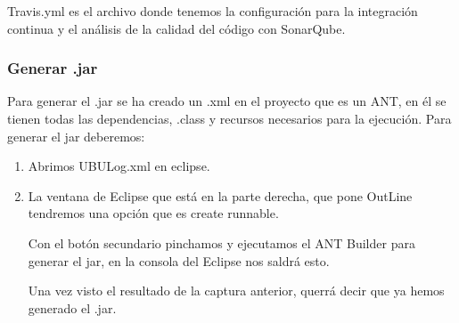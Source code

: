 Travis.yml es el archivo donde tenemos la configuración para la integración continua y el análisis de la calidad del código con SonarQube. \cite{web:travis,web:sonarqube}

\subsubsection{Generar .jar}\label{generar-jar}

Para generar el .jar se ha creado un .xml en el proyecto que es un ANT, en él se tienen todas las dependencias, .class y recursos necesarios para la ejecución. Para generar el jar deberemos:

\begin{enumerate}
	\tightlist
	\item
	Abrimos UBULog.xml en eclipse.
	\item
	La ventana de Eclipse que está en la parte derecha, que pone OutLine tendremos una opción que es create runnable.
	
	
	Con el botón secundario pinchamos y ejecutamos el ANT Builder para generar el jar, en la consola del Eclipse nos saldrá esto.
	
	
	Una vez visto el resultado de la captura anterior, querrá decir que ya hemos generado el .jar.
	
\end{enumerate}

